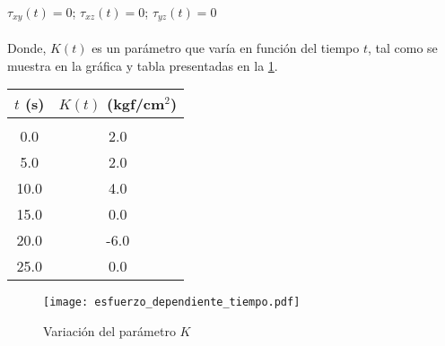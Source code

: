 \documentclass[../notas medios.tex]{subfiles}
\begin{document}
\begin{enumerate}
	\hspace*{10mm} $ \tau_{xy} (t) = 0$; \hspace*{5mm} $\tau_{xz} (t) = 0$; \hspace*{5mm} $\tau_{yz} (t) = 0$ \\
\\	
Donde, $K(t)$ es un par\'ametro que var\'ia en funci\'on del tiempo $t$, tal como se muestra en la gráfica y tabla presentadas en la \cref{fig:esfuerzo_dependiente_tiempo}. \\

\begin{minipage}{0.3\textwidth}
\begin{tabular}{cc}
$t$ (s) & $K(t)$ (kgf/cm$^2$) \\ 
\hline\\
0.0 & 2.0 \\ 
5.0 & 2.0 \\ 
10.0 & 4.0 \\ 
15.0 & 0.0 \\ 
20.0 & -6.0 \\  
25.0 & 0.0\\
\end{tabular} 
\end{minipage}
\begin{minipage}{0.6\textwidth}
\begin{figure}[H]
  \centering
  \texttt{[image: esfuerzo\_dependiente\_tiempo.pdf]} 	
  \caption{Variación del parámetro $K$}
  \label{fig:esfuerzo_dependiente_tiempo}
\end{figure}
\end{minipage}


\end{enumerate}
\end{document}
